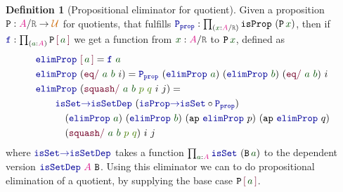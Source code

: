 \documentclass[twoside,11pt,openright]{report}
\theoremstyle{plain} %
\theoremstyle{definition}
\newtheorem{defn}[thm]{Definition}%
\theoremstyle{remark}
\newcommand*{\term}[1]{\textcolor{green!30!black}{#1}} %
\newcommand*{\pathterm}[1]{\textcolor{green!65!red!75!black}{#1}}
\newcommand*{\type}[1]{\textcolor{magenta!90!black}{#1}}
\newcommand*{\universe}[1]{\textcolor{orange!80!black}{#1}}
\newcommand*{\relation}[1]{\textcolor{gray!75!black}{\ensuremath{\mathtt{#1}}}}
\newcommand*{\function}[1]{\textcolor{blue!60!black}{\ensuremath{\mathtt{#1}}}}
\newcommand*{\constructor}[1]{\textcolor{purple!60!black}{\ensuremath{\mathtt{#1}}}}
\newcommand*{\typeformer}[1]{\ensuremath{\mathtt{#1}}}
\newcommand*{\quotientconstructor}[1]{\constructor{[}\,#1\,\constructor{]}}
\begin{document}
\begin{defn}[Propositional eliminator for quotient]
  \label{defn:propositional-elimination-quotient}
  Given a proposition \(\typeformer{P} : \type{A} / \relation{R} \rightarrow \universe{\mathcal{U}}\) for quotients, that fulfills \(\function{P_{prop}} : \prod_{(\term{x} : \type{A} / \relation{R})} \typeformer{isProp}~(\typeformer{P}\,\term{x})\), then if \(\function{f} : \prod_{(\term{a} : \type{A})} \typeformer{P}\,\quotientconstructor{\term{a}}\) we get a function from \(\term{x} : \type{A} / \relation{R}\) to \(\typeformer{P}\,\term{x}\), defined as
  \begin{equation}
    \begin{aligned}
      &\function{elimProp}~\quotientconstructor{\term{a}} = \function{f}~\term{a}\\
      &\function{elimProp}~(\constructor{eq/}~\term{a}~\term{b}~i) = \function{P_{prop}}~(\function{elimProp}~\term{a})~(\function{elimProp}~\term{b})~(\constructor{eq/}~\term{a}~\term{b})~i \\
      &\function{elimProp}~(\constructor{squash/}~\term{a}~\term{b}~\pathterm{p}~\pathterm{q}~i~j) = \\
      &\qquad\function{isSet{\rightarrow}isSetDep}~(\function{isProp{\rightarrow}isSet} \circ \function{P_{prop}}) \\
      &\qquad\quad (\function{elimProp}~\term{a})~(\function{elimProp}~\term{b})~(\mathtt{ap}~\function{elimProp}~p)~(\mathtt{ap}~\function{elimProp}~q)\\
      &\qquad\quad (\constructor{squash/}~\term{a}~\term{b}~\pathterm{p}~\pathterm{q})~i~j
    \end{aligned}
  \end{equation}
  where \(\function{isSet{\rightarrow}isSetDep}\) takes a function \(\prod_{\term{a} : \type{A}} \function{isSet}~(\typeformer{B}\,\term{a})\) to the dependent version \(\function{isSetDep}~\type{A}~\typeformer{B}\). Using this eliminator we can to do propositional elimination of a quotient, by supplying the base case \(\typeformer{P}\,\quotientconstructor{\term{a}}\).
\end{defn}
\end{document}
